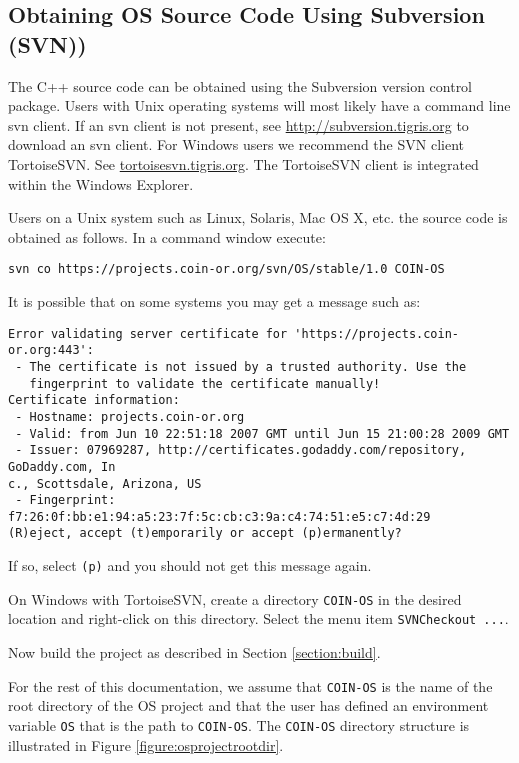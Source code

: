 \documentclass[11pt]{article}
\newcounter{Fig}
\renewcommand{\_}{{\char"5F}}
\renewcommand{\{}{{\char"7B}}
\renewcommand{\}}{{\char"7D}}
\renewcommand{\^}{{\char"0D}}
\renewcommand{\'}{{\char"0D}}
\begin{document}
\subsection{Obtaining OS Source Code Using Subversion (SVN))}\label{section:svn}

The C++ source code can be obtained using the Subversion version control package.  Users with Unix operating systems will most likely have a command line svn client.  If an svn client is not present, see \url{http://subversion.tigris.org} to download an svn client.   For Windows users we recommend the  SVN client  TortoiseSVN.  See \url{tortoisesvn.tigris.org}.  The TortoiseSVN client is integrated within the Windows  Explorer.  

Users on a Unix system such as Linux, Solaris, Mac OS X, etc. the source code is obtained as follows. In a command window execute:

\begin{verbatim}
svn co https://projects.coin-or.org/svn/OS/stable/1.0 COIN-OS
\end{verbatim}


It is possible that on some systems you may get a message such as:
\begin{verbatim}
Error validating server certificate for 'https://projects.coin-or.org:443':
 - The certificate is not issued by a trusted authority. Use the
   fingerprint to validate the certificate manually!
Certificate information:
 - Hostname: projects.coin-or.org
 - Valid: from Jun 10 22:51:18 2007 GMT until Jun 15 21:00:28 2009 GMT
 - Issuer: 07969287, http://certificates.godaddy.com/repository, GoDaddy.com, In
c., Scottsdale, Arizona, US
 - Fingerprint: f7:26:0f:bb:e1:94:a5:23:7f:5c:cb:c3:9a:c4:74:51:e5:c7:4d:29
(R)eject, accept (t)emporarily or accept (p)ermanently?
\end{verbatim}

If so, select {\tt (p)} and you should not get this message again.

On Windows with TortoiseSVN, create a directory {\tt COIN-OS} in the desired location and right-click on this directory.   Select the menu item {\tt SVNCheckout ...}.


Now build the project as described in  Section \ref{section:build}. 

For the rest of this documentation, we assume that  {\tt COIN-OS} is the name of the root directory of the OS project and that the user has defined an environment variable {\tt OS} that is the path to {\tt COIN-OS}.  The {\tt COIN-OS} directory structure is illustrated in Figure \ref{figure:osprojectrootdir}.
\end{document}
